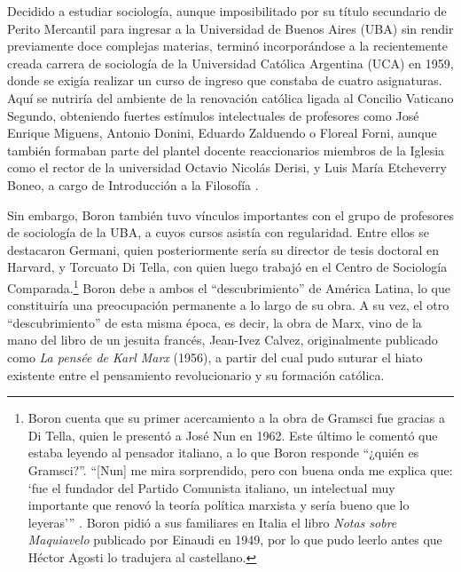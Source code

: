 Decidido a estudiar sociología, aunque imposibilitado por su título secundario de Perito Mercantil para ingresar a la Universidad de Buenos Aires (UBA) sin rendir previamente doce complejas materias, terminó incorporándose a la recientemente creada carrera de sociología de la Universidad Católica Argentina (UCA) en 1959, donde se exigía realizar un curso de ingreso que constaba de cuatro asignaturas. Aquí se nutriría del ambiente de la renovación católica ligada al Concilio Vaticano Segundo, obteniendo fuertes estímulos intelectuales de profesores como José Enrique Miguens, Antonio Donini, Eduardo Zalduendo o Floreal Forni, aunque también formaban parte del plantel docente reaccionarios miembros de la Iglesia como el rector de la universidad Octavio Nicolás Derisi, y Luis María Etcheverry Boneo, a cargo de Introducción a la Filosofía \parencite{281-ZANCA2006}.

Sin embargo, Boron también tuvo vínculos importantes con el grupo de profesores de sociología de la UBA, a cuyos cursos asistía con regularidad. Entre ellos se destacaron Germani, quien posteriormente sería su director de tesis doctoral en Harvard, y Torcuato Di Tella, con quien luego trabajó en el Centro de Sociología Comparada.\footnote{Boron cuenta que su primer acercamiento a la obra de Gramsci fue gracias a Di Tella, quien le presentó a José Nun en 1962. Este último le comentó que estaba leyendo al pensador italiano, a lo que Boron responde \enquote{¿quién es Gramsci?}. \enquote{[Nun] me mira sorprendido, pero con buena onda me explica que: \enquote{fue el fundador del Partido Comunista italiano, un intelectual muy importante que renovó la teoría política marxista y sería bueno que lo leyeras}} \parencite[114]{1444-BORON2023}. Boron pidió a sus familiares en Italia el libro \emph{Notas sobre Maquiavelo} publicado por Einaudi en 1949, por lo que pudo leerlo antes que Héctor Agosti lo tradujera al castellano.} Boron debe a ambos el \enquote{descubrimiento} de América Latina, lo que constituiría una preocupación permanente a lo largo de su obra. A su vez, el otro \enquote{descubrimiento} de esta misma época, es decir, la obra de Marx, vino de la mano del libro de un jesuita francés, Jean-Ivez Calvez, originalmente publicado como \emph{La pensée de Karl Marx} (1956), a partir del cual pudo suturar el hiato existente entre el pensamiento revolucionario y su formación católica.

